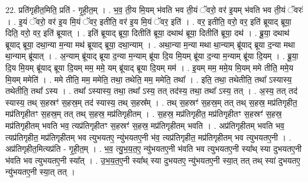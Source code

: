 \documentclass[17pt]{extarticle}
\begin{document}
22. प्रति॑गृहीत॒मिति॒ प्रति॑ - गृ॒ही॒त॒म् । . भ॒व॒ ती॒य मि॒यम् भ॑वति भव ती॒यं ॅवरो॒ वर॑ इ॒यम् भ॑वति भव ती॒यं ॅवरः॑ । . इ॒यं ॅवरो॒ वर॑ इ॒य मि॒यं ॅवर॒ इतीति॒ वर॑ इ॒य मि॒यं ॅवर॒ इति॑ । . वर॒ इतीति॒ वरो॒ वर॒ इति॑ ब्रूयाद् ब्रूया॒ दिति॒ वरो॒ वर॒ इति॑ ब्रूयात् । . इति॑ ब्रूयाद् ब्रूया॒ दितीति॑ ब्रूया॒ दथाथ॑ ब्रूया॒ दितीति॑ ब्रूया॒ दथ॑ । . ब्रू॒या॒ दथाथ॑ ब्रूयाद् ब्रूया॒ दथा॒न्या म॒न्या मथ॑ ब्रूयाद् ब्रूया॒ दथा॒न्याम् । . अथा॒न्या म॒न्या मथा था॒न्याम् ब्रू॑याद् ब्रूया द॒न्या मथा था॒न्याम् ब्रू॑यात् । . अ॒न्याम् ब्रू॑याद् ब्रूया द॒न्या म॒न्याम् ब्रू॑या दि॒य मि॒यम् ब्रू॑या द॒न्या म॒न्याम् ब्रू॑या दि॒यम् । . ब्रू॒या॒ दि॒य मि॒यम् ब्रू॑याद् ब्रूया दि॒यम् मम॒ ममे॒ यम् ब्रू॑याद् ब्रूया दि॒यम् मम॑ । . इ॒यम् मम॒ ममे॒य मि॒यम् ममे तीति॒ ममे॒य मि॒यम् ममेति॑ । . ममे तीति॒ मम॒ ममेति॒ तथा॒ तथेति॒ मम॒ ममेति॒ तथा᳚ । . इति॒ तथा॒ तथेतीति॒ तथा᳚ ऽस्यास्य॒ तथेतीति॒ तथा᳚ ऽस्य । . तथा᳚ ऽस्यास्य॒ तथा॒ तथा᳚ ऽस्य॒ तत् तद॑स्य॒ तथा॒ तथा᳚ ऽस्य॒ तत् । . अ॒स्य॒ तत् तद॑ स्यास्य॒ तथ् स॒हस्रꣳ॑ स॒हस्र॒म् तद॑ स्यास्य॒ तथ् स॒हस्र᳚म् । . तथ् स॒हस्रꣳ॑ स॒हस्र॒म् तत् तथ् स॒हस्र॒ मप्र॑तिगृहीत॒ मप्र॑तिगृहीतꣳ स॒हस्र॒म् तत् तथ् स॒हस्र॒ मप्र॑तिगृहीतम् । . स॒हस्र॒ मप्र॑तिगृहीत॒ मप्र॑तिगृहीतꣳ स॒हस्रꣳ॑ स॒हस्र॒ मप्र॑तिगृहीतम् भवति भव॒ त्यप्र॑तिगृहीतꣳ स॒हस्रꣳ॑ स॒हस्र॒ मप्र॑तिगृहीतम् भवति । . अप्र॑तिगृहीतम् भवति भव॒ त्यप्र॑तिगृहीत॒ मप्र॑तिगृहीतम् भव त्युभयतए॒ न्यु॑भयतए॒नी भ॑व॒ त्यप्र॑तिगृहीत॒ मप्र॑तिगृहीतम् भव त्युभयतए॒नी । . अप्र॑तिगृहीत॒मित्यप्र॑ति - गृ॒ही॒त॒म् । . भ॒व॒ त्यु॒भ॒य॒त॒ए॒ न्यु॑भयतए॒नी भ॑वति भव त्युभयतए॒नी स्या᳚थ् स्या दुभयतए॒नी भ॑वति भव त्युभयतए॒नी स्या᳚त् । . उ॒भ॒य॒त॒ए॒नी स्या᳚थ् स्या दुभयतए॒ न्यु॑भयतए॒नी स्या॒त् तत् तथ् स्या॑ दुभयतए॒ न्यु॑भयतए॒नी स्या॒त् तत् । \newline
\end{document}
